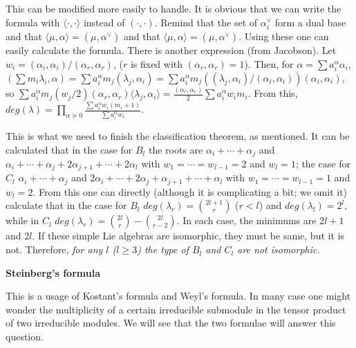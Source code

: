 \documentclass{article}
\begin{document}
This can be modified more easily to handle.
It is obvious that we can write the formula with $\langle \cdot, \cdot \rangle$ instead of $(\cdot, \cdot)$.
Remind that the set of $\alpha_i^\vee$ form a dual base and that $\langle \mu, \alpha \rangle = (\mu, \alpha^\vee)$ and that $\langle \mu, \alpha \rangle = (\mu, \alpha^\vee)$.
Using these one can easily calculate the formula.
There is another expression (from Jacobson).
Let $w_i = (\alpha_i, \alpha_i) / (\alpha_r, \alpha_r)$, ($r$ is fixed with $(\alpha_r, \alpha_r) = 1$).
Then, for $\alpha = \sum a_i^\alpha \alpha_i$, $(\sum m_i \lambda_i, \alpha) = \sum a_i^\alpha m_j (\lambda_j, \alpha_i) = \sum a_i^\alpha m_j ((\lambda_j, \alpha_i) / (\alpha_i, \alpha_i)) (\alpha_i, \alpha_i)$, so $\sum a_i^\alpha m_j (w_j/2) (\alpha_r, \alpha_r) \langle \lambda_j, \alpha_i \rangle = \frac{(\alpha_r, \alpha_r)}{2} \sum a_i^\alpha w_i m_i$.
From this, $deg(\lambda) = \prod_{\alpha \succeq 0} \frac{\sum a_i^\alpha w_i (m_i + 1)}{\sum a_i^\alpha w_i}$.

This is what we need to finish the classification theorem, as mentioned.
It can be calculated that in the case for $B_l$ the roots are $\alpha_i + \cdots + \alpha_j$ and $\alpha_i + \cdots + \alpha_j + 2\alpha_{j + 1} + \cdots + 2\alpha_l$ with $w_1 = \cdots = w_{l - 1} = 2$ and $w_l = 1$; the case for $C_l$ $\alpha_i + \cdots + \alpha_j$ and $2\alpha_i + \cdots + 2\alpha_j + \alpha_{j + 1} + \cdots + \alpha_l$ with $w_1 = \cdots = w_{l - 1} = 1$ and $w_l = 2$.
From this one can directly (although it is complicating a bit; we omit it) calculate that in the case for $B_l$ $deg(\lambda_r) = \binom{2l + 1}{r}$ ($r < l$) and $deg(\lambda_l) = 2^l$, while in $C_l$ $deg(\lambda_r) = \binom{2l}{r} - \binom{2l}{r - 2}$.
In each case, the minimums are $2l + 1$ and $2l$.
If these simple Lie algebras are isomorphic, they must be same, but it is not.
Therefore, \textit{for any $l$ ($l \ge 3$) the type of $B_l$ and $C_l$ are not isomorphic.}

\newpage

\textbf{Steinberg's formula}

This is a usage of Kostant's formula and Weyl's formula.
In many case one might wonder the multiplicity of a certain irreducible submodule in the tensor product of two irreducible modules.
We will see that the two formulae will answer this question.
\end{document}
